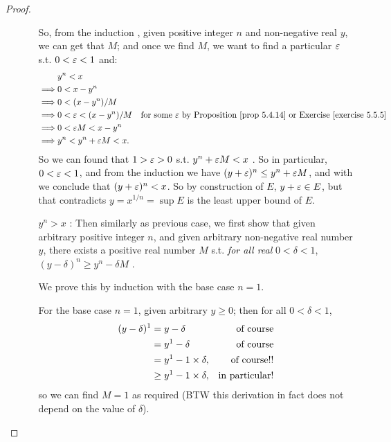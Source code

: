 \begin{proof}
\begin{enumerate}
\begin{itemize}
        So, from the induction \MAROON{(*)}, given positive integer \(n\) and non-negative real \(y\), we can get that \(M\);
        and once we find \(M\), we want to find a particular \(\varepsilon\) s.t. \(0 < \varepsilon < 1\) and:
        \begin{align*}
                     & y^n < x \\
            \implies & 0 < x - y^n \\
            \implies & 0 < (x - y^n)/M \\
            \implies & 0 < \varE < (x - y^n)/M & \text{for some \(\varE\) by \PROP{5.4.14} or \EXEC{5.5.5}} \\
            \implies & 0 < \varE M < x - y^n \\
            \implies & y^n < y^n + \varE M < x.
        \end{align*}
        So we can found that \(1 > \varepsilon > 0\) s.t. \(y^n + \varepsilon M < x\) .
        So in particular, \(0 < \varepsilon < 1\), and from the induction \MAROON{(*)} we have \((y + \varepsilon)^n \le y^n + \varepsilon M\), and with  we conclude that \((y + \varepsilon)^n < x\).
        So by construction of \(E\), \(y + \varepsilon \in E\), but that contradicts \(y = x^{1/n} = \sup E\) is the least upper bound of \(E\).
    \item [\(y^n > x\)]:
        Then similarly as previous case, we first show that given arbitrary positive integer \(n\), and given arbitrary non-negative real number \(y\), there exists a positive real number \(M\) s.t.
        \emph{for all real} \(0 < \delta < 1\), \((y - \delta)^n \ge y^n - \delta M\) \MAROON{(**)}.
        
        We prove this by induction with the base case \(n = 1\).
        
        For the base case \(n = 1\), given arbitrary \(y \ge 0\); then for all \(0 < \delta < 1\),
        \begin{align*}
        (y - \delta)^1 & = y - \delta & \text{of course} \\
                       & = y^1 - \delta & \text{of course} \\
                       & = y^1 - 1 \times \delta, & \text{of course!!} \\
                       & \ge y^1 - 1 \times \delta, & \text{in particular!}
        \end{align*}
        so we can find \(M = 1\) as required (BTW this derivation in fact does not depend on the value of \(\delta\)).
        

\end{itemize}
\end{enumerate}
\end{proof}
